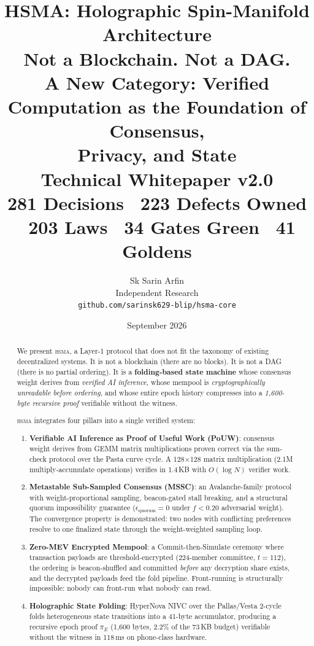 \documentclass[11pt, a4paper]{article}
\title{\textbf{HSMA: Holographic Spin-Manifold Architecture}\\[0.8em]
\Large Not a Blockchain. Not a DAG.\\[0.3em]
\large A New Category: Verified Computation as the Foundation of Consensus,\\
Privacy, and State\\[0.8em]
\normalsize Technical Whitepaper v2.0\\
\textcolor{hsmaGreen}{281 Decisions \textbullet\ 223 Defects Owned \textbullet\ 203 Laws \textbullet\ 34 Gates Green \textbullet\ 41 Goldens}}
\author{Sk Sarin Arfin\\
\small Independent Research\\
\small \texttt{github.com/sarinsk629-blip/hsma-core}}
\date{September 2026}
\newcommand{\hsma}{\textsc{hsma}}
\begin{document}
\maketitle

\begin{abstract}
We present \hsma{}, a Layer-1 protocol that does not fit the taxonomy of existing decentralized systems. It is not a blockchain (there are no blocks). It is not a DAG (there is no partial ordering). It is a \textbf{folding-based state machine} whose consensus weight derives from \textit{verified AI inference}, whose mempool is \textit{cryptographically unreadable before ordering}, and whose entire epoch history compresses into a \textit{1,600-byte recursive proof} verifiable without the witness.

\hsma{} integrates four pillars into a single verified system:
\begin{enumerate}
\item \textbf{Verifiable AI Inference as Proof of Useful Work (PoUW)}: consensus weight derives from GEMM matrix multiplications proven correct via the sum-check protocol over the Pasta curve cycle. A 128$\times$128 matrix multiplication (2.1M multiply-accumulate operations) verifies in 1.4\,KB with $O(\log N)$ verifier work.
\item \textbf{Metastable Sub-Sampled Consensus (MSSC)}: an Avalanche-family protocol with weight-proportional sampling, beacon-gated stall breaking, and a structural quorum impossibility guarantee ($\epsilon_{\text{quorum}} = 0$ under $f < 0.20$ adversarial weight). The convergence property is demonstrated: two nodes with conflicting preferences resolve to one finalized state through the weight-weighted sampling loop.
\item \textbf{Zero-MEV Encrypted Mempool}: a Commit-then-Simulate ceremony where transaction payloads are threshold-encrypted (224-member committee, $t{=}112$), the ordering is beacon-shuffled and committed \textit{before} any decryption share exists, and the decrypted payloads feed the fold pipeline. Front-running is structurally impossible: nobody can front-run what nobody can read.
\item \textbf{Holographic State Folding}: HyperNova NIVC over the Pallas/Vesta 2-cycle folds heterogeneous state transitions into a 41-byte accumulator, producing a recursive epoch proof $\pi_E$ (1,600 bytes, 2.2\% of the 73\,KB budget) verifiable without the witness in 118\,ms on phone-class hardware.
\end{enumerate}


\end{abstract}
\end{document}

